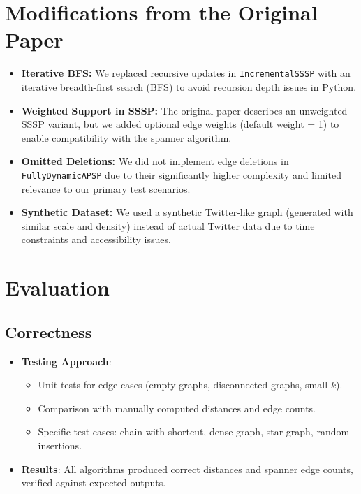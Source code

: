 \documentclass[11pt]{article}
\begin{document}
\section*{Modifications from the Original Paper}

\begin{itemize}
    \item \textbf{Iterative BFS:} We replaced recursive updates in \texttt{IncrementalSSSP} with an iterative breadth-first search (BFS) to avoid recursion depth issues in Python.
    
    \item \textbf{Weighted Support in SSSP:} The original paper describes an unweighted SSSP variant, but we added optional edge weights (default weight = 1) to enable compatibility with the spanner algorithm.
    
    \item \textbf{Omitted Deletions:} We did not implement edge deletions in \texttt{FullyDynamicAPSP} due to their significantly higher complexity and limited relevance to our primary test scenarios.
    
    \item \textbf{Synthetic Dataset:} We used a synthetic Twitter-like graph (generated with similar scale and density) instead of actual Twitter data due to time constraints and accessibility issues.
\end{itemize}


\section{Evaluation}
\subsection{Correctness}
\begin{itemize}
    \item \textbf{Testing Approach}:
    \begin{itemize}
        \item Unit tests for edge cases (empty graphs, disconnected graphs, small $k$).
        \item Comparison with manually computed distances and edge counts.
        \item Specific test cases: chain with shortcut, dense graph, star graph, random insertions.
    \end{itemize}
    \item \textbf{Results}: All algorithms produced correct distances and spanner edge counts, verified against expected outputs.
\end{itemize}
\end{document}
